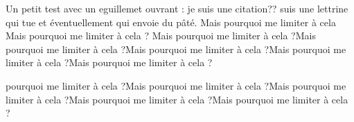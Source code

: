 




\maketitle
\tableofcontents 

\begin{nAbstract}
Un petit test avec un eguillemet ouvrant : \nOg je suis une citation?? \fg
{} suis une lettrine qui tue et éventuellement qui envoie du pâté. Mais pourquoi me limiter à cela Mais pourquoi me limiter à cela ? Mais pourquoi me limiter à cela ?Mais pourquoi me limiter à cela ?Mais pourquoi me limiter à cela ?Mais pourquoi me limiter à cela ?Mais pourquoi me limiter à cela ?

 pourquoi me limiter à cela ?Mais pourquoi me limiter à cela ?Mais pourquoi me limiter à cela ?Mais pourquoi me limiter à cela ?Mais pourquoi me limiter à cela ?
\end{nAbstract}

